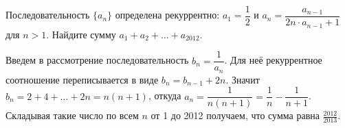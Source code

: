 Последовательность $\{ a_n \}$ определена рекуррентно:
$a_1 = \dfrac{1}{2}$ и
$a_n = \dfrac{a_{n - 1}}{2 n \cdot a_{n - 1} + 1}$ для $n > 1$.
Найдите сумму $a_1 + a_2 + \ldots + a_{2012}$.

\solution
Введем в рассмотрение последовательность $b_n = \dfrac{1}{a_n}$.
Для неё рекуррентное соотношение переписывается в виде $b_n = b_{n - 1} + 2 n$.
Значит
$b_n = 2 + 4 + \ldots + 2 n = n (n + 1)$,
откуда
$a_n = \dfrac{1}{n (n + 1)} = \dfrac{1}{n} - \dfrac{1}{n + 1}$.
Складывая такие число по всем $n$ от 1 до 2012 получаем, что сумма равна
$\frac{2012}{2013}$.

